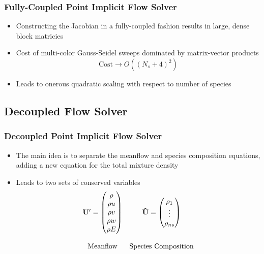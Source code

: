 \documentclass{beamer}
\begin{document}
\begin{frame}
  \frametitle{Fully-Coupled Point Implicit Flow Solver}
  \begin{itemize}
    \item Constructing the Jacobian in a fully-coupled fashion results in large,
      dense block matricies
    \item Cost of multi-color Gauss-Seidel sweeps dominated by matrix-vector
      products 
      \[
        \text{Cost} \to O((N_s + 4)^2)
      \]
    \item Leads to onerous quadratic scaling with respect to number of species
  \end{itemize}
\end{frame}

\subsection{Decoupled Flow Solver}

\begin{frame}
  \frametitle{Decoupled Point Implicit Flow Solver}
  \begin{itemize}
    \item The main idea is to separate the meanflow and species composition
      equations, adding a new equation for the total mixture density
    \item Leads to two sets of conserved variables
      \begin{equation*}
      	\begin{matrix}
      		\mathbf U'=\begin{pmatrix}
      			\rho \\
      			\rho u \\
      			\rho v \\
      			\rho w \\
      			\rho E
      		\end{pmatrix} &
      		\mathbf{\hat{U}}=\begin{pmatrix}
      			\rho_1 \\
      			\vdots \\
      			\rho_{ns}
      		\end{pmatrix} \\ \\
          \text{Meanflow} & \text{Species Composition}
      	\end{matrix} 
      \end{equation*}
  \end{itemize}
\end{frame}
\end{document}
